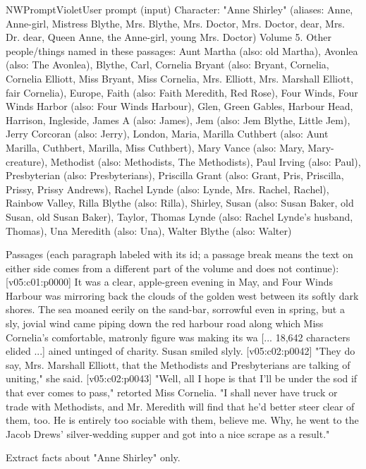 \begin{nwprompt}{NWPromptViolet}{User prompt (input)}
Character: "Anne Shirley" (aliases: Anne, Anne-girl, Mistress Blythe, Mrs. Blythe, Mrs. Doctor, Mrs. Doctor, dear, Mrs. Dr. dear, Queen Anne, the Anne-girl, young Mrs. Doctor)
Volume 5.
Other people/things named in these passages: Aunt Martha (also: old Martha), Avonlea (also: The Avonlea), Blythe, Carl, Cornelia Bryant (also: Bryant, Cornelia, Cornelia Elliott, Miss Bryant, Miss Cornelia, Mrs. Elliott, Mrs. Marshall Elliott, fair Cornelia), Europe, Faith (also: Faith Meredith, Red Rose), Four Winds, Four Winds Harbor (also: Four Winds Harbour), Glen, Green Gables, Harbour Head, Harrison, Ingleside, James A (also: James), Jem (also: Jem Blythe, Little Jem), Jerry Corcoran (also: Jerry), London, Maria, Marilla Cuthbert (also: Aunt Marilla, Cuthbert, Marilla, Miss Cuthbert), Mary Vance (also: Mary, Mary-creature), Methodist (also: Methodists, The Methodists), Paul Irving (also: Paul), Presbyterian (also: Presbyterians), Priscilla Grant (also: Grant, Pris, Priscilla, Prissy, Prissy Andrews), Rachel Lynde (also: Lynde, Mrs. Rachel, Rachel), Rainbow Valley, Rilla Blythe (also: Rilla), Shirley, Susan (also: Susan Baker, old Susan, old Susan Baker), Taylor, Thomas Lynde (also: Rachel Lynde's husband, Thomas), Una Meredith (also: Una), Walter Blythe (also: Walter)

Passages (each paragraph labeled with its id; a passage break means the text on either side comes from a different part of the volume and does not continue):
[v05:c01:p0000] It was a clear, apple-green evening in May, and Four Winds Harbour was mirroring back the clouds of the golden west between its softly dark shores. The sea moaned eerily on the sand-bar, sorrowful even in spring, but a sly, jovial wind came piping down the red harbour road along which Miss Cornelia's comfortable, matronly figure was making its wa
[... 18,642 characters elided ...]
ained untinged of charity. Susan smiled slyly.
[v05:c02:p0042] "They do say, Mrs. Marshall Elliott, that the Methodists and Presbyterians are talking of uniting," she said.
[v05:c02:p0043] "Well, all I hope is that I'll be under the sod if that ever comes to pass," retorted Miss Cornelia. "I shall never have truck or trade with Methodists, and Mr. Meredith will find that he'd better steer clear of them, too. He is entirely too sociable with them, believe me. Why, he went to the Jacob Drews' silver-wedding supper and got into a nice scrape as a result."

Extract facts about "Anne Shirley" only.
\end{nwprompt}

